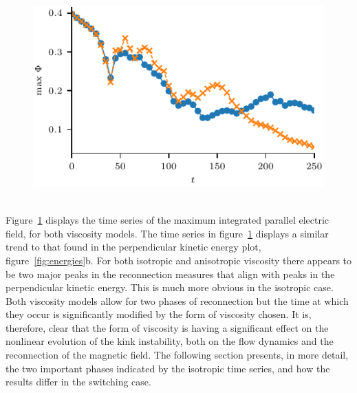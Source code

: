 \begin{figure}[t]
    \centering
      \centering
      \includegraphics[width=0.5\linewidth]{max_parallel_electric_field.pdf}
    ~
    \label{fig:reconnection-rates}
\end{figure}

Figure~\ref{fig:reconnection-rates} displays the time series of the maximum integrated parallel electric field, for both viscosity models. The time series in figure~\ref{fig:reconnection-rates} displays a similar trend to that found in the perpendicular kinetic energy plot, figure~\ref{fig:energies}b. For both isotropic and anisotropic viscosity there appears to be two major peaks in the reconnection measures that align with peaks in the perpendicular kinetic energy. This is much more obvious in the isotropic case. Both viscosity models allow for two phases of reconnection but the time at which they occur is significantly modified by the form of viscosity chosen. It is, therefore, clear that the form of viscosity is having a significant effect on the nonlinear evolution of the kink instability, both on the flow dynamics and the reconnection of the magnetic field. The following section presents, in more detail, the two important phases indicated by the isotropic time series, and how the results differ in the switching case.

